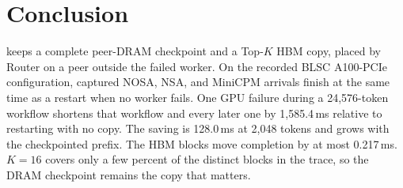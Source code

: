 \section{Conclusion}
\label{sec:conclusion}

\system keeps a complete peer-DRAM checkpoint and a Top-$K$ HBM copy, placed
by Router on a peer outside the failed worker. On the recorded BLSC
A100-PCIe configuration, captured NOSA, NSA, and MiniCPM arrivals finish at
the same time as a restart when no worker fails. One GPU failure during a
24{,}576-token workflow shortens that workflow and every later one by
1{,}585.4\,ms relative to restarting with no copy. The saving is 128.0\,ms
at 2{,}048 tokens and grows with the checkpointed prefix. The HBM blocks
move completion by at most 0.217\,ms. $K{=}16$ covers only a few percent of
the distinct blocks in the trace, so the DRAM checkpoint remains the copy
that matters.
